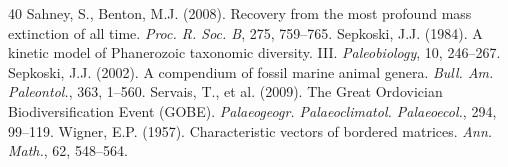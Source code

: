 \documentclass[12pt,a4paper]{article}
\begin{document}
\begin{thebibliography}{40}
 Sahney, S., Benton, M.J. (2008). Recovery from the most profound mass extinction of all time. \textit{Proc. R. Soc. B}, 275, 759--765.
 Sepkoski, J.J. (1984). A kinetic model of Phanerozoic taxonomic diversity. III. \textit{Paleobiology}, 10, 246--267.
 Sepkoski, J.J. (2002). A compendium of fossil marine animal genera. \textit{Bull. Am. Paleontol.}, 363, 1--560.
 Servais, T., et al. (2009). The Great Ordovician Biodiversification Event (GOBE). \textit{Palaeogeogr. Palaeoclimatol. Palaeoecol.}, 294, 99--119.
 Wigner, E.P. (1957). Characteristic vectors of bordered matrices. \textit{Ann. Math.}, 62, 548--564.
\end{thebibliography}
\end{document}
